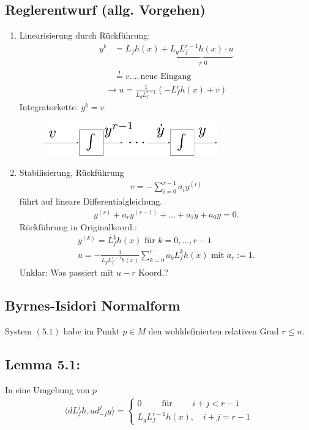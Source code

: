 \documentclass[ngerman]{tudscrreprt}
\begin{document}
\subsection*{Reglerentwurf (allg. Vorgehen)}
\begin{enumerate}
\item Linearisierung durch Rückführung: \begin{align*} 
y^{k} &= L_f h(x) + \underbrace{L_gL_f^{r-1} h(x)\cdot u}_{\ne 0} \\ &\overset{!}{=} v\dots,\text{neue Eingang}  \tag{5.2}
\end{align*}
\begin{align*}
\rightarrow u = \frac{1}{L_g L_f^{r-1}}(-L_f^r h(x) + v) \tag{5.3}
\end{align*}
Integratorkette: $y^{k} = v$
\begin{figure}[H]
\centering
\def\svgwidth{200pt} 
  \includegraphics[width=7.5cm]{im312.pdf}
\end{figure}
\item Stabilisierung, Rückführung \begin{align*} v = - \sum\limits_{i=0}^{r-1} a_i y^{(i)} \tag{5.4} \end{align*} führt auf lineare Differentialgleichung. \begin{align*} y^{(r)} + a_ry^{(r-1)} + \dots + a_1\dot y + a_0 y = 0. \end{align*}
Rückführung in Originalkoord.: \begin{align*} y^{(k)} = L_f^{k}h(x) \text{ für } k=0,\dots, r-1 \\ 
u = -\frac{1}{L_g L_f^{r-1} h(x)} \sum\limits_{k=0}^{r} a_k L_f^{k} h(x) \text{ mit } a_r:=1. \tag{5.5}
\end{align*}
Unklar: Was passiert mit $u-r$ Koord.?
\end{enumerate} 
\subsection{Byrnes-Isidori Normalform}
System $(5.1)$ habe im Punkt $p\in M$ den wohldefinierten relativen Grad $r\le n.$
\subsection*{Lemma 5.1:} In eine Umgebung von $p$  \begin{align*} \langle dL_f^i h, ad_{-f}^{j}g \rangle = \left\{\substack{0 \qquad \text{ für }\qquad i + j < r-1\\ L_gL_f^{r-1}h(x), \quad i+j = r-1}\right. \tag{5.6}\end{align*}
\end{document}
